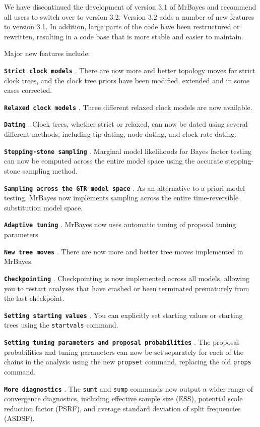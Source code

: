 \documentclass[12pt]{book}
\newcommand{\ttt}[1]{\texttt{#1} }
\newcommand{\tb}[1]{\texttt{\textbf{#1}} }
\begin{document}
We have discontinued the development of version 3.1 of MrBayes and recommend all users to switch
over to version 3.2. Version 3.2 adds a number of new features to version 3.1. In addition, large
parts of the code have been restructured or rewritten, resulting in a code base that is more stable
and easier to maintain.

Major new features include:

\tb{Strict clock models}. There are now more and better topology moves for strict clock trees, and
the clock tree priors have been modified, extended and in some cases corrected.

\tb{Relaxed clock models}. Three different relaxed clock models are now available.

\tb{Dating}. Clock trees, whether strict or relaxed, can now be dated using several different
methods, including tip dating, node dating, and clock rate dating.

\tb{Stepping-stone sampling}. Marginal model likelihoods for Bayes factor testing can now be
computed across the entire model space using the accurate stepping-stone sampling method.

\tb{Sampling across the GTR model space}. As an alternative to a priori model testing, MrBayes now
implements sampling across the entire time-reversible substitution model space.

\tb{Adaptive tuning}. MrBayes now uses automatic tuning of proposal tuning parameters.

\tb{New tree moves}. There are now more and better tree moves implemented in MrBayes.

\tb{Checkpointing}. Checkpointing is now implemented across all models, allowing you to restart
analyses that have crashed or been terminated prematurely from the last checkpoint.

\tb{Setting starting values}. You can explicitly set starting values or starting trees using the
\ttt{startvals} command.

\tb{Setting tuning parameters and proposal probabilities}. The proposal probabilities and tuning
parameters can now be set separately for each of the chains in the analysis using the new
\ttt{propset} command, replacing the old \ttt{props} command.

\tb{More diagnostics}. The \ttt{sumt} and \ttt{sump} commands now output a wider range of
convergence diagnostics, including effective sample size (ESS), potential scale reduction factor
(PSRF), and average standard deviation of split frequencies (ASDSF).
\end{document}
